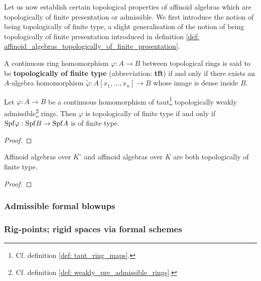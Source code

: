             Let us now establish certain topological properties of affinoid algebras which are topologically of finite presentation or admissible. We first introduce the notion of being topologically of finite type, a slight generalisation of the notion of being topologically of finite presentation introduced in definition \ref{def: affinoid_algebras_topologically_of_finite_presentation}.
            \begin{definition} \label{def: ring_maps_topologically_of_finite_type}
                A continuous ring homomorphism $\varphi: A \to B$ between topological rings is said to be \textbf{topologically of finite type} (abbreviation: \textbf{tft}) if and only if there exists an $A$-algebra homomorphism $\tilde{\varphi}: A[x_1, ..., x_n] \to B$ whose image is dense inside $B$.
            \end{definition}
            \begin{lemma}
                Let $\varphi: A \to B$ be a continuous homomorphism of taut\footnote{Cf. definition \ref{def: taut_ring_maps}.} topologically weakly admissible\footnote{Cf. definition \ref{def: weakly_pre_admissible_rings}.} rings. Then $\varphi$ is topologically of finite type if and only if $\mathrm{Spf} \varphi: \mathrm{Spf} B \to \mathrm{Spf} A$ is of finite type.
            \end{lemma}
                \begin{proof}
                    
                \end{proof}
            \begin{proposition} \label{prop: affinoid_algebras_are_topologically_of_finite_type}
                Affinoid algebras over $K^{\circ}$ and affinoid algebras over $K$ are both topologically of finite type.
            \end{proposition}
                \begin{proof}
                    
                \end{proof}
        
        \subsubsection{Admissible formal blowups}
        
        \subsubsection{Rig-points; rigid spaces via formal schemes}
